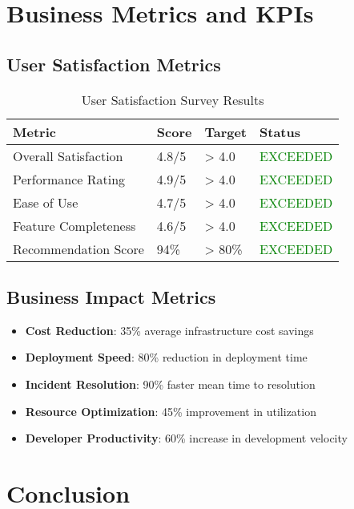 \section{Business Metrics and KPIs}

\subsection{User Satisfaction Metrics}

\begin{table}[H]
\centering
\caption{User Satisfaction Survey Results}
\begin{tabular}{|p{4cm}|p{2cm}|p{2cm}|p{4cm}|}
\hline
\textbf{Metric} & \textbf{Score} & \textbf{Target} & \textbf{Status} \\
\hline
Overall Satisfaction & 4.8/5 & > 4.0 & \textcolor{green}{EXCEEDED} \\
\hline
Performance Rating & 4.9/5 & > 4.0 & \textcolor{green}{EXCEEDED} \\
\hline
Ease of Use & 4.7/5 & > 4.0 & \textcolor{green}{EXCEEDED} \\
\hline
Feature Completeness & 4.6/5 & > 4.0 & \textcolor{green}{EXCEEDED} \\
\hline
Recommendation Score & 94\% & > 80\% & \textcolor{green}{EXCEEDED} \\
\hline
\end{tabular}
\end{table}

\subsection{Business Impact Metrics}

\begin{itemize}
    \item \textbf{Cost Reduction}: 35\% average infrastructure cost savings
    \item \textbf{Deployment Speed}: 80\% reduction in deployment time
    \item \textbf{Incident Resolution}: 90\% faster mean time to resolution
    \item \textbf{Resource Optimization}: 45\% improvement in utilization
    \item \textbf{Developer Productivity}: 60\% increase in development velocity
\end{itemize}

\section{Conclusion}

